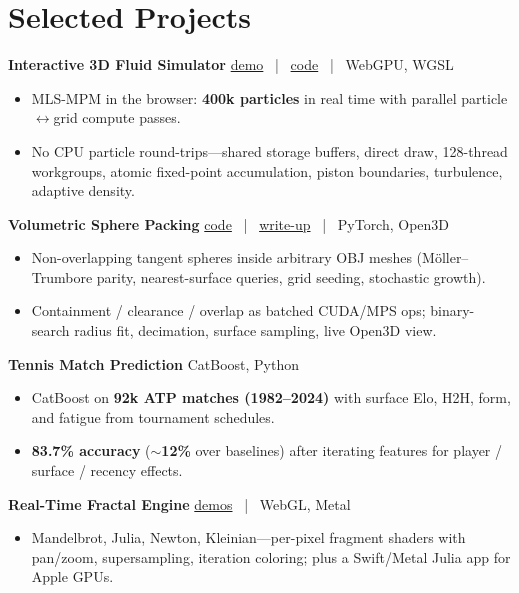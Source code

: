 \documentclass[10pt,letterpaper]{article}
\newcommand{\proj}[2]{%
  \vspace{6.5pt}%
  {\bodyfont\bfseries #1}%
  \hfill
  {\metafont\color{faint}\footnotesize #2}%
  \par\vspace{2pt}%
}
\begin{document}
\section*{Selected Projects}
{\bodyfont\fontsize{9.6}{12.6}\selectfont

\proj{Interactive 3D Fluid Simulator}{%
  \href{https://dimitrichrysafis.github.io/media/post10/index.html}{demo}%
  \ {\color{hair}|}\ %
  \href{https://github.com/DimitriChrysafis/3d-Volumetric-Fluid-Simulator}{code}%
  \ {\color{hair}|}\ %
  WebGPU, WGSL}
\begin{itemize}
  \item MLS-MPM in the browser: \textbf{400k particles} in real time with parallel particle$\leftrightarrow$grid compute passes.
  \item No CPU particle round-trips---shared storage buffers, direct draw, 128-thread workgroups, atomic fixed-point accumulation, piston boundaries, turbulence, adaptive density.
\end{itemize}

\proj{Volumetric Sphere Packing}{%
  \href{https://github.com/DimitriChrysafis/SpherePacker}{code}%
  \ {\color{hair}|}\ %
  \href{https://dimitrichrysafis.github.io/\#post/post8.md}{write-up}%
  \ {\color{hair}|}\ %
  PyTorch, Open3D}
\begin{itemize}
  \item Non-overlapping tangent spheres inside arbitrary OBJ meshes (M\"oller--Trumbore parity, nearest-surface queries, grid seeding, stochastic growth).
  \item Containment / clearance / overlap as batched CUDA/MPS ops; binary-search radius fit, decimation, surface sampling, live Open3D view.
\end{itemize}

\proj{Tennis Match Prediction}{CatBoost, Python}
\begin{itemize}
  \item CatBoost on \textbf{92k ATP matches (1982--2024)} with surface Elo, H2H, form, and fatigue from tournament schedules.
  \item \textbf{83.7\% accuracy} (\textbf{$\sim$12\%} over baselines) after iterating features for player / surface / recency effects.
\end{itemize}

\proj{Real-Time Fractal Engine}{%
  \href{https://dimitrichrysafis.github.io/\#post/post6.md}{demos}%
  \ {\color{hair}|}\ %
  WebGL, Metal}
\begin{itemize}
  \item Mandelbrot, Julia, Newton, Kleinian---per-pixel fragment shaders with pan/zoom, supersampling, iteration coloring; plus a Swift/Metal Julia app for Apple GPUs.
\end{itemize}

}
\end{document}
